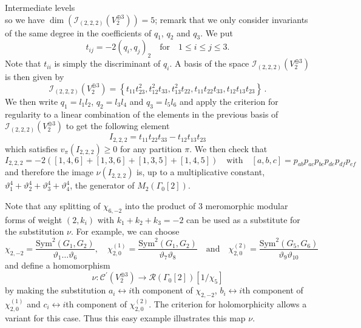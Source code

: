 \documentclass[12pt]{amsart}
\numberwithin{equation}{section}
\newcommand{\Sym}{{\mathrm{Sym}}}
\numberwithin{equation}{section}
\theoremstyle{definition}
\theoremstyle{remark}
\begin{document}
\begin{section}{Intermediate levels}
\[ \]
so we have $\dim (\mathcal{I}_{(2,2,2)}(V_2^{\oplus 3}))=5$; remark that we only consider invariants 
of the same degree in the coefficients of $q_1$, $q_2$ and $q_3$. We put
\[
t_{ij}=-2(q_i,q_j)_2 \quad \text{for} \quad 1 \leqslant i\leqslant j\leqslant 3. 
\]
Note that $t_{ii}$ is simply the discriminant of $q_i$.
A basis of the space $\mathcal{I}_{(2,2,2)}(V_2^{\oplus 3})$ is then given by
\[
\mathcal{I}_{(2,2,2)}(V_2^{\oplus 3})=
\left\{
t_{11}t_{23}^2, t_{12}^2t_{33}, t_{13}^2t_{22}, t_{11}t_{22}t_{33}, t_{12}t_{13}t_{23}
\right\} \, .
\]
We then write $q_1=l_1l_2$, $q_2=l_3l_4$ and $q_3=l_5l_6$ and apply the criterion for regularity to a linear combination of the elements in the previous basis
of $\mathcal{I}_{(2,2,2)}(V_2^{\oplus 3})$ to get the following element
\[
I_{2,2,2}=t_{11}t_{22}t_{33}-t_{12}t_{13}t_{23}
\]
which satisfies $v_{\pi}(I_{2,2,2})\geqslant 0$ for any partition $\pi$. We then check that
\[
I_{2,2,2}=-2([1,4,6]+[1,3,6]+[1,3,5]+[1,4,5]) \quad \text{with} \quad [a,b,c]= p_{ab}p_{ac}p_{bc}p_{de}p_{df}p_{ef}
\] 
and therefore the image $\nu(I_{2,2,2})$ is, up to a multiplicative constant,
$\vartheta_1^4+\vartheta_2^4+\vartheta_3^4+\vartheta_4^4$, the generator of $M_2(\Gamma_0[2])$.

Note that any splitting of $\chi_{6,-2}$ into the product of $3$ meromorphic modular forms of 
weight $(2,k_i)$ with $k_1+k_2+k_3=-2$ can be used as a substitute for the substitution $\nu$. For example, we can choose
\[
\chi_{2,-2}=\frac{\Sym^2(G_1,G_2)}{\vartheta_1\ldots\vartheta_6}, \quad \chi^{(1)}_{2,0}=\frac{\Sym^2(G_1,G_2)}{\vartheta_7\vartheta_8} \quad \text{and} 
\quad 
\chi^{(2)}_{2,0}=\frac{\Sym^2(G_5,G_6)}{\vartheta_9\vartheta_{10}}
\]
and define a homomorphism
$$
\nu: \mathcal{C}^{\prime}(V_2^{\oplus 3}) \longrightarrow \mathcal{R}(\Gamma_0[2])[1/\chi_5]
$$
by making the substitution $a_i \leftrightarrow i$th component of $\chi_{2,-2}$, $b_i \leftrightarrow i$th component of $\chi^{(1)}_{2,0}$ and
$c_i \leftrightarrow i$th component of $\chi^{(2)}_{2,0}$. The criterion for holomorphicity allows a variant
for this case. Thus this easy example illustrates this map $\nu$.



\end{section}
\end{document}

